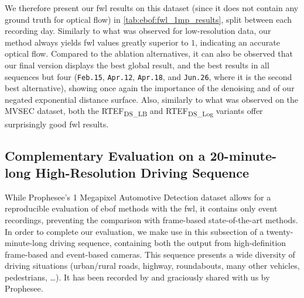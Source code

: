 We therefore present our \acrshort{fwl} results on this dataset (since it does not contain any ground truth for optical flow) in \cref{tab:ebof:fwl_1mp_results}, split between each recording day. Similarly to what was observed for low-resolution data, our method always yields \acrshort{fwl} values greatly superior to \(1\), indicating an accurate optical flow. Compared to the ablation alternatives, it can also be observed that our final version displays the best global result, and the best results in all sequences but four (\verb|Feb.15|, \verb|Apr.12|, \verb|Apr.18|, and \verb|Jun.26|, where it is the second best alternative), showing once again the importance of the denoising and of our negated exponential distance surface. Also, similarly to what was observed on the MVSEC dataset, both the RTEF\textsubscript{DS\_LB} and RTEF\textsubscript{DS\_Log} variants offer surprisingly good \acrshort{fwl} results.

\subsection{Complementary Evaluation on a 20-minute-long High-Resolution Driving Sequence}
While Prophesee's 1 Megapixel Automotive Detection dataset allows for a reproducible evaluation of \acrshort{ebof} methods with the \acrshort{fwl}, it contains only event recordings, preventing the comparison with frame-based state-of-the-art methods. In order to complete our evaluation, we make use in this subsection of a twenty-minute-long driving sequence, containing both the output from high-definition frame-based and event-based cameras. This sequence presents a wide diversity of driving situations (urban/rural roads, highway, roundabouts, many other vehicles, pedestrians, \dots). It has been recorded by and graciously shared with us by Prophesee.

\begin{table}[ht]
  \centering
  \caption{\acrshort{fwl} results on the 20-minute-long driving sequence.}\label{tab:ebof:fwl_20min_results}
\end{table}

